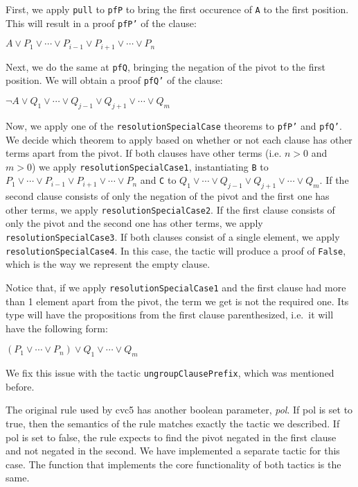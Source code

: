 First, we apply \texttt{pull} to \texttt{pfP} to bring the first occurence of \texttt{A} to the first position. This will result
in a proof \texttt{pfP'} of the clause:

\begin{center}
  $A \vee P_{1} \vee \cdots \vee P_{i - 1} \vee P_{i + 1} \vee \cdots \vee P_{n}$
\end{center}

Next, we do the same at \texttt{pfQ}, bringing the negation of the pivot to the first position. We will obtain a proof \texttt{pfQ'} of
the clause:

\begin{center}
  $\neg A \vee Q_{1} \vee \cdots \vee Q_{j - 1} \vee Q_{j + 1} \vee \cdots \vee Q_{m}$
\end{center}

Now, we apply one of the \texttt{resolutionSpecialCase} theorems to \texttt{pfP'} and \texttt{pfQ'}. We decide which theorem
to apply based on whether or not each clause has other terms apart from the pivot. If both clauses have other terms (i.e. $n > 0$ and
$m > 0$) we apply \texttt{resolutionSpecialCase1}, instantiating \texttt{B} to $P_{1} \vee \cdots \vee P_{i - 1} \vee P_{i + 1} \vee \cdots \vee P_{n}$ and \texttt{C} to $Q_{1} \vee \cdots \vee Q_{j - 1} \vee Q_{j + 1} \vee \cdots \vee Q_{m}$. If the second clause consists of only the negation of the pivot and the first one has other terms, we apply \texttt{resolutionSpecialCase2}. If the first clause consists of only the pivot and the second one has other terms, we apply \texttt{resolutionSpecialCase3}. If both clauses consist of a single element, we apply \texttt{resolutionSpecialCase4}. In this case, the tactic will produce a proof of \texttt{False}, which is the way we represent the empty clause.

Notice that, if we apply \texttt{resolutionSpecialCase1} and the first clause had more than 1 element
apart from the pivot, the term we get is not the required one. Its type will have the
propositions from the first clause parenthesized, i.e.\ it will have the following form:

\begin{center}
  $(P_{1} \vee \cdots \vee P_{n}) \vee Q_{1} \vee \cdots \vee Q_{m}$
\end{center}

We fix this issue with the tactic \texttt{ungroupClausePrefix}, which was mentioned before.

The original rule used by cvc5 has another
boolean parameter, \textit{pol}. If pol is set to true, then the semantics of the rule matches
exactly the tactic we described. If pol is set to false, the rule expects to find the pivot
negated in the first clause and not negated in the second. We have implemented a separate
tactic for this case. The function that implements the core functionality of both tactics is
the same.

